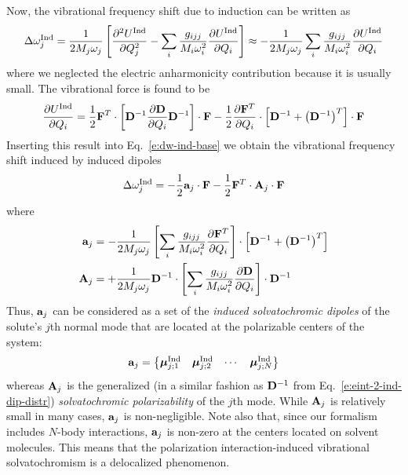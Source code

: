 \documentclass[a4paper,titlepage,twoside,fleqn,12pt]{book}
\newcommand{\BM}[1]{\bm{#1}}
\newcommand{\fderiv}[2]{\ensuremath{
\frac{\partial #1}{\partial #2}}}
\newcommand{\sderiv}[2]{\ensuremath{
\frac{\partial^2 #1}{\partial #2^2}
}}
\begin{document}
\begin{refsection}
Now, the vibrational frequency shift due to induction can be written
as
%
\begin{equation}\label{e:dw-ind-base}
\Delta \omega_j^{\rm Ind} =
\frac{1}{2M_j\omega_j} \left[ 
\sderiv{U^{\rm Ind}}{Q_j} -
\sum_i \frac{g_{ijj}}{M_i\omega_i^2}\fderiv{U^{\rm Ind}}{Q_i}
\right]
\approx 
-\frac{1}{2M_j\omega_j}\sum_i \frac{g_{ijj}}{M_i\omega_i^2}\fderiv{U^{\rm Ind}}{Q_i}
\end{equation}
%
where we neglected the electric anharmonicity contribution because it is usually small.
The vibrational force is found to be
%
\begin{equation} \label{e:vibr-force-ind}
\fderiv{U^{\rm Ind}}{Q_i} = \frac{1}{2} {\bf F}^{T} \cdot
     \left[ 
           {\bf D}^{-1} \fderiv{{\bf D}}{Q_i} {\bf D}^{-1}
     \right] \cdot {\bf F}
     - \frac{1}{2} \fderiv{{\bf F}^{T}}{Q_i} \cdot
     \left[
            {\bf D}^{-1} + \left({\bf D}^{-1} \right)^T
     \right] \cdot {\bf F}
\end{equation}
%
Inserting this result into Eq.~\eqref{e:dw-ind-base}
we obtain the vibrational frequency shift induced by induced dipoles
%
\begin{equation}\label{e:dw-ind-avec}
\Delta\omega_j^{\rm Ind} = - \frac{1}{2}                 {\bf a}_j \cdot {\bf F} 
                           - \frac{1}{2} {\bf F}^T \cdot {\bf A}_j \cdot {\bf F}
\end{equation}
%
where
%
\begin{subequations} \label{e:a-A}
 \begin{align}
 {\bf a}_j &= -\frac{1}{2M_j\omega_j} \left[ \sum_i \frac{g_{ijj}}{M_i\omega_i^2} 
               \fderiv{{\bf F}^T}{Q_i} \right] \cdot \left[ {\bf D}^{-1} + \left({\bf D}^{-1}\right)^T\right]\\
%
 {\bf A}_j &= +\frac{1}{2M_j\omega_j} {\bf D}^{-1} \cdot 
               \left[ \sum_i \frac{g_{ijj}}{M_i\omega_i^2} \fderiv{{\bf D}}{Q_i} \right] 
               \cdot {\bf D}^{-1}
 \end{align}
\end{subequations}
%
Thus, ${\bf a}_j$ can be considered as a set of the \emph{induced
solvatochromic dipoles} of the solute's $j$th normal mode that are 
located at the polarizable centers of the system:
%
\begin{equation} \label{e:a-vec}
 {\bf a}_j =
 \begin{Bmatrix}
  {\BM \mu}_{j;1}^{\rm Ind} & {\BM \mu}_{j;2}^{\rm Ind} & \cdots & {\BM \mu}_{j;N}^{\rm Ind}
 \end{Bmatrix}
\end{equation}
%
whereas ${\bf A}_j$ is the generalized (in a similar fashion as ${\bf D}^{-1}$ 
from Eq.~\eqref{e:eint-2-ind-dip-distr}) \emph{solvatochromic polarizability} of the $j$th mode.
While ${\bf A}_j$ is relatively small in many cases, ${\bf a}_j$ is non\hyp{}negligible.
Note also that, since our formalism includes $N$\hyp{}body interactions,
${\bf a}_j$ is non\hyp{}zero at the centers located on solvent molecules.
This means that the polarization interaction\hyp{}induced vibrational solvatochromism
is a delocalized phenomenon. 


\end{refsection}
\end{document}
